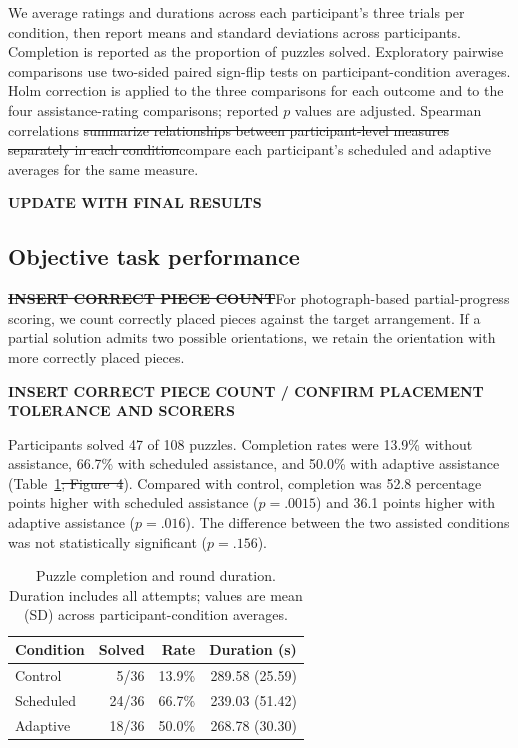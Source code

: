 \documentclass[sigconf,anonymous,balance=false]{aamas} %
\DeclareRobustCommand{\DIFadd}[1]{{\color{reviewadd}#1}} %
\DeclareRobustCommand{\DIFdel}[1]{{\color{reviewdel}\sout{#1}}} %
\providecommand{\DIFaddbegin}{} %
\providecommand{\DIFaddend}{} %
\providecommand{\DIFdelbegin}{} %
\providecommand{\DIFdelend}{} %
\providecommand{\DIFscaledelfig}{0.5}
\newlength{\DIFdelgraphicswidth} %
\newlength{\DIFdelgraphicsheight} %
\providecommand{\DIFaddincludegraphics}[2][]{{\color{blue}\fbox{\DIFOincludegraphics[#1]{#2}}}} %
\providecommand{\DIFdelincludegraphics}[2][]{%
\sbox{\DIFdelgraphicsbox}{\DIFOincludegraphics[#1]{#2}}%
\settoboxwidth{\DIFdelgraphicswidth}{\DIFdelgraphicsbox} %
\settoboxtotalheight{\DIFdelgraphicsheight}{\DIFdelgraphicsbox} %
\scalebox{\DIFscaledelfig}{%
\parbox[b]{\DIFdelgraphicswidth}{\usebox{\DIFdelgraphicsbox}\\[-\baselineskip] \rule{\DIFdelgraphicswidth}{0em}}\llap{\resizebox{\DIFdelgraphicswidth}{\DIFdelgraphicsheight}{%
\setlength{\unitlength}{\DIFdelgraphicswidth}%
\begin{picture}(1,1)%
\thicklines\linethickness{2pt} %
{\color[rgb]{1,0,0}\put(0,0){\framebox(1,1){}}}%
{\color[rgb]{1,0,0}\put(0,0){\line( 1,1){1}}}%
{\color[rgb]{1,0,0}\put(0,1){\line(1,-1){1}}}%
\end{picture}%
}\hspace*{3pt}}} %
} %
\DeclareRobustCommand{\DIFaddbegin}{\DIFOaddbegin \let\includegraphics\DIFaddincludegraphics} %
\DeclareRobustCommand{\DIFaddend}{\DIFOaddend \let\includegraphics\DIFOincludegraphics} %
\DeclareRobustCommand{\DIFdelbegin}{\DIFOdelbegin \let\includegraphics\DIFdelincludegraphics} %
\DeclareRobustCommand{\DIFdelend}{\DIFOaddend \let\includegraphics\DIFOincludegraphics} %
\begin{document}
We average ratings and durations across each participant's three trials per condition, then report means and standard deviations across participants. Completion is reported as the proportion of puzzles solved. Exploratory pairwise comparisons use two-sided paired sign-flip tests on participant-condition averages. Holm correction is applied to the three comparisons for each outcome and to the four assistance-rating comparisons; reported $p$ values are adjusted. Spearman correlations \DIFdelbegin \DIFdel{summarize relationships between participant-level measures separately in each condition}\DIFdelend \DIFaddbegin \DIFadd{compare each participant’s scheduled and adaptive averages for the same measure}\DIFaddend .

\textbf{UPDATE WITH FINAL RESULTS}

\subsection{Objective task performance}

\DIFdelbegin \textbf{\DIFdel{INSERT CORRECT PIECE COUNT}}\DIFdelend \DIFaddbegin \DIFadd{For photograph-based partial-progress scoring, we count correctly placed pieces against the target arrangement. If a partial solution admits two possible orientations, we retain the orientation with more correctly placed pieces.
}\DIFaddend 

\DIFaddbegin \DIFadd{\textbf{INSERT CORRECT PIECE COUNT / CONFIRM PLACEMENT TOLERANCE AND SCORERS}
}

\DIFaddend Participants solved 47 of 108 puzzles. Completion rates were 13.9\% without assistance, 66.7\% with scheduled assistance, and 50.0\% with adaptive assistance (Table~\ref{tab:performance}\DIFdelbegin \DIFdel{; Figure~4}\DIFdelend ). Compared with control, completion was 52.8 percentage points higher with scheduled assistance ($p=.0015$) and 36.1 points higher with adaptive assistance ($p=.016$). The difference between the two assisted conditions was not statistically significant ($p=.156$).

\begin{table}[t]
\centering
\caption{Puzzle completion and round duration. Duration includes all attempts; values are mean (SD) across participant-condition averages.}
\label{tab:performance}
\begin{tabular}{lrrr}
\toprule
Condition & Solved & Rate & Duration (s) \\
\midrule
Control & 5/36 & 13.9\% & 289.58 (25.59) \\
Scheduled & 24/36 & 66.7\% & 239.03 (51.42) \\
Adaptive & 18/36 & 50.0\% & 268.78 (30.30) \\
\bottomrule
\end{tabular}
\end{table}
\end{document}
